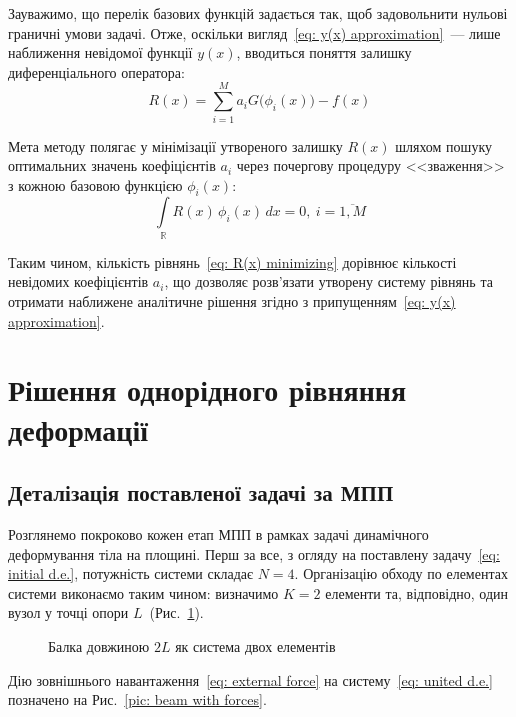 \documentclass{mathreport}
\begin{document}
Зауважимо, що перелік базових функцій задається так, щоб задовольнити нульові граничні умови задачі. Отже, оскільки вигляд~\eqref{eq: y(x) approximation}~--- лише наближення невідомої функції $y(x)$, вводиться поняття залишку диференціального оператора:
\begin{equation}\label{eq: R(x) residual}
    R(x) = \sum\limits_{i=1}^{M} a_i G\bigl( \phi_i(x) \bigr) - f(x)
\end{equation}

Мета методу полягає у мінімізації утвореного залишку $R(x)$ шляхом пошуку оптимальних значень коефіцієнтів $a_i$ через почергову процедуру <<зваження>> з кожною базовою функцією $\phi_i(x)$:
\begin{equation}\label{eq: R(x) minimizing}
    \int\limits_{\mathbb{R}} R(x)\, \phi_i(x)\, dx = 0,\ i=\overline{1,M}
\end{equation}

Таким чином, кількість рівнянь~\eqref{eq: R(x) minimizing} дорівнює кількості невідомих коефіцієнтів $a_i$, що дозволяє розв'язати утворену систему рівнянь та отримати наближене аналітичне рішення згідно з припущенням~\eqref{eq: y(x) approximation}.

\section{Рішення однорідного рівняння деформації}

\subsection*{Деталізація поставленої задачі за МПП}
\label{section: TMM detalization}

Розглянемо покроково кожен етап МПП в рамках задачі динамічного деформування тіла на площині. Перш за все, з огляду на поставлену задачу~\eqref{eq: initial d.e.}, потужність системи складає $N=4$. Організацію обходу по елементах системи виконаємо таким чином: визначимо $K=2$ елементи та, відповідно, один вузол у точці опори $L$~(Рис.~\ref{pic: beam}).

\vspace{0.4cm}
\begin{figure}[H]\centering
    
    \caption{Балка довжиною $2L$ як система двох елементів}
    \label{pic: beam}
\end{figure}

Дію зовнішнього навантаження~\eqref{eq: external force} на систему~\eqref{eq: united d.e.} позначено на Рис.~\ref{pic: beam with forces}.
\end{document}
